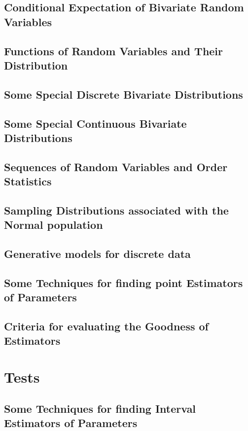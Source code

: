 \documentclass[a4paper, 10pt]{scrbook}  %
\begin{document}
\chapter{Conditional Expectation of Bivariate Random Variables}

\chapter{Functions of Random Variables and Their Distribution}

\chapter{Some Special Discrete Bivariate Distributions}

\chapter{Some Special Continuous Bivariate Distributions}

\chapter{Sequences of Random Variables and Order Statistics}

\chapter{Sampling Distributions associated with the Normal population}

\chapter{Generative models for discrete data}

\chapter{Some Techniques for finding point Estimators of Parameters}

\chapter{Criteria for evaluating the Goodness of Estimators}

\part{Tests}
\chapter{Some Techniques for finding Interval Estimators of Parameters}

\end{document}
